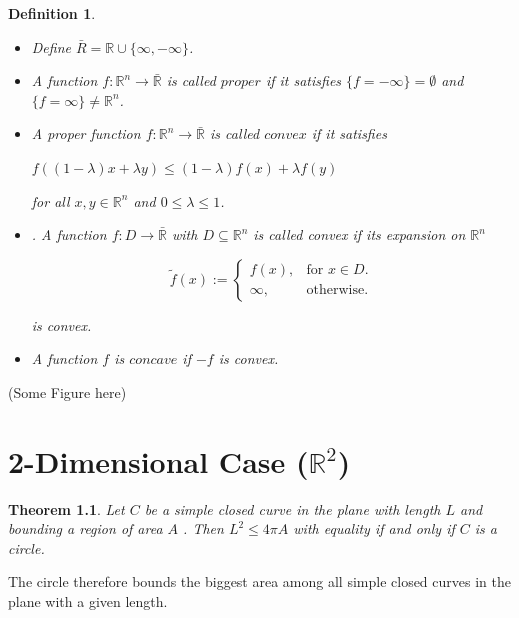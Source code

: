 \documentclass[a4paper]{book}
\newtheorem{theorem}{Theorem}%
\newtheorem{definition}{Definition}%
\begin{document}
\begin{definition}
	\begin{itemize}
		\item Define $\bar{R}=\mathbb{R}\cup\{ \infty,-\infty\}$.
		\item A function $f:\mathbb{R}^n\to\bar{\mathbb{R}}$ is called $proper$ if it satisfies $\{f=-\infty\}=\emptyset$ and $\{f=\infty\}\neq\mathbb{R}^n$.
		\item A proper function $f:\mathbb{R}^n\to\bar{\mathbb{R}}$ is called $convex$ if it satisfies 
		\begin{center}
			$f((1-\lambda)x+\lambda y)\leq(1-\lambda)f(x)+\lambda f(y)$
		\end{center}
		for all $x, y\in\mathbb{R}^n$ and $0\leq\lambda\leq1$.
		\item . A function $f:D\to\bar{\mathbb{R}}$ with $D\subseteq\mathbb{R}^n$ is called convex if its expansion on $\mathbb{R}^n$
		\begin{center}
			\begin{equation}
				  \tilde{f}(x):=\begin{cases}
				    	f(x), & \text{for $x\in D$}.\\
				   	 \infty, & \text{otherwise}.
				  \end{cases}
			\end{equation}
		\end{center}
		is convex.
		\item A function $f$ is $concave$ if $-f$ is convex.
	\end{itemize}
\end{definition}
(Some Figure here)

\chapter{2-Dimensional Case ($\mathbb{R}^2$)}
\begin{theorem}
    Let $C$ be a simple closed curve in the plane with length $L$ and bounding a region of area $A$ . 
    Then $L^2 \leq 4\pi A$ with equality if and only if $C$ is a circle.
\end{theorem}
The circle therefore bounds the biggest area among all simple closed curves in the plane with a given length.
\end{document}
